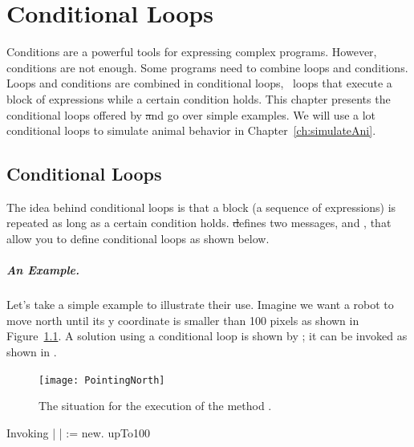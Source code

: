 \ifx\wholebook\relax\else



\fi

\chapter{Conditional Loops}\label{ch:ConditionalLoops}

Conditions are a powerful tools for expressing complex programs. However, conditions are not enough. Some programs need to combine loops and conditions. Loops and conditions are combined in conditional loops, \ie\ loops that execute a block of expressions while a certain condition holds. This chapter presents the conditional loops offered by \st and go over simple examples. We will use a lot conditional loops to simulate animal behavior  in Chapter~\ref{ch:simulateAni}.

\section{Conditional Loops}
The idea behind conditional loops is that a block (a sequence of expressions) is repeated as long as a certain condition holds. \st defines two messages,  and , that allow you to define conditional loops as shown  below. 

\paragraph{An Example.} Let's take a simple example to illustrate their use.  Imagine we want a robot to move  north until its y coordinate is smaller than 100 pixels as shown in Figure~\ref{fig:PointingNorth}.  A solution using a conditional loop is shown by ; it can be invoked as shown in .

\begin{figure}[h]
\begin{center}\texttt{[image: PointingNorth]}\end{center}
\caption{The situation for the execution of the method . \label{fig:PointingNorth}}
\end{figure}


\begin{scriptwithtitle}{Invoking }\label{scr:upto}
| \caro |
\caro := \Turtle new.
\caro upTo100
\end{scriptwithtitle}

